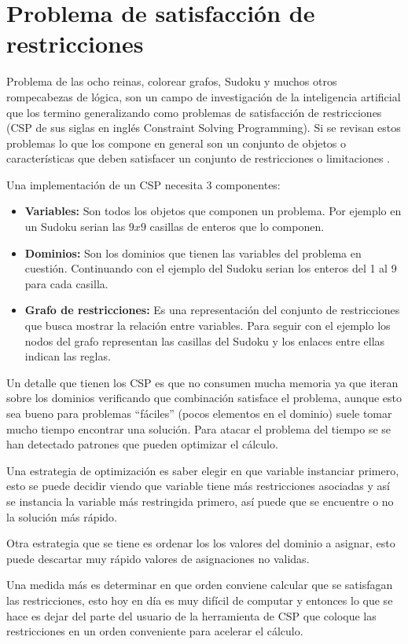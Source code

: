 \section{Problema de satisfacción de restricciones} \label{sect:CSP}

Problema de las ocho reinas, colorear grafos, Sudoku y muchos otros rompecabezas 
de lógica, son un campo de investigación de la inteligencia artificial que los
termino generalizando como problemas de satisfacción de restricciones (CSP de 
sus siglas en inglés Constraint Solving Programming). Si se revisan estos 
problemas lo que los compone en general son un conjunto de objetos o 
características que deben satisfacer un conjunto de restricciones o 
limitaciones \cite{RN09}.

Una implementación de un CSP necesita 3 componentes:
\begin{itemize}
\item{\textbf{Variables:} Son todos los objetos que componen un problema. Por 
ejemplo en un Sudoku serian las $9x9$ casillas de enteros que lo componen.}
\item{\textbf{Dominios:} Son los dominios que tienen las variables del problema
en cuestión. Continuando con el ejemplo del Sudoku serian los enteros del 1 al
9 para cada casilla.}
\item{\textbf{Grafo de restricciones:} Es una representación del conjunto de 
restricciones que busca mostrar la relación entre variables. Para seguir con el
ejemplo los nodos del grafo representan las casillas del Sudoku y los enlaces 
entre ellas indican las reglas.}
\end{itemize}

Un detalle que tienen los CSP es que no consumen mucha memoria ya que iteran 
sobre los dominios verificando que combinación satisface el problema, aunque 
esto sea bueno para problemas ``fáciles'' (pocos elementos en el dominio) suele
tomar mucho tiempo encontrar una solución. Para atacar el problema del tiempo se
se han detectado patrones que pueden optimizar el cálculo. 

Una estrategia de optimización es saber elegir en que variable instanciar 
primero, esto se puede decidir viendo que variable tiene más restricciones 
asociadas y así se instancia la variable más restringida primero, así puede que 
se encuentre o no la solución más rápido.

Otra estrategia que se tiene es ordenar los los valores del dominio a asignar,
esto puede descartar muy rápido valores de asignaciones no validas.

Una medida más es determinar en que orden conviene calcular que se satisfagan
las restricciones, esto hoy en día es muy difícil de computar y entonces lo que
se hace es dejar del parte del usuario de la herramienta de CSP que coloque las
restricciones en un orden conveniente para acelerar el cálculo.
